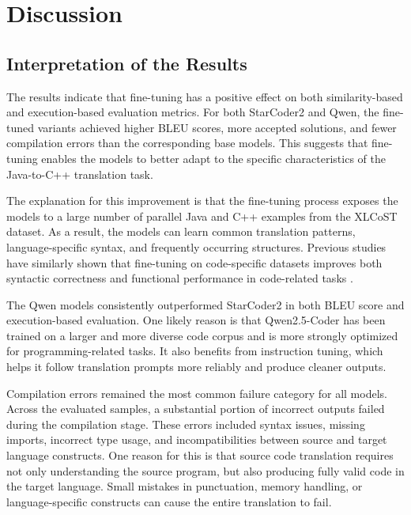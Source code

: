 \chapter{Discussion}

\section{Interpretation of the Results}

The results indicate that fine-tuning has a positive effect on both similarity-based
and execution-based evaluation metrics. For both StarCoder2 and Qwen, the
fine-tuned variants achieved higher BLEU scores, more accepted solutions, and
fewer compilation errors than the corresponding base models. This suggests that
fine-tuning enables the models to better adapt to the specific characteristics of
the Java-to-C++ translation task.

The explanation for this improvement is that the fine-tuning process exposes the models to a
large number of parallel Java and C++ examples from the XLCoST dataset. As a
result, the models can learn common translation patterns, language-specific
syntax, and frequently occurring structures. Previous studies have similarly
shown that fine-tuning on code-specific datasets improves both syntactic
correctness and functional performance in code-related tasks \cite{peft_code, hu2021lora, zhu2022xlcost}.

The Qwen models consistently outperformed StarCoder2 in both BLEU score and
execution-based evaluation. One likely reason is that Qwen2.5-Coder has been
trained on a larger and more diverse code corpus and is more strongly optimized
for programming-related tasks. It also benefits from instruction tuning, which
helps it follow translation prompts more reliably and produce cleaner outputs.


Compilation errors remained the most common failure category for all models.
Across the evaluated samples, a substantial portion of incorrect outputs failed
during the compilation stage. These errors included syntax issues, missing
imports, incorrect type usage, and incompatibilities between source and target
language constructs. One reason for this is that source code translation requires
not only understanding the source program, but also producing fully valid code
in the target language. Small mistakes in punctuation, memory handling, or
language-specific constructs can cause the entire translation to fail.



